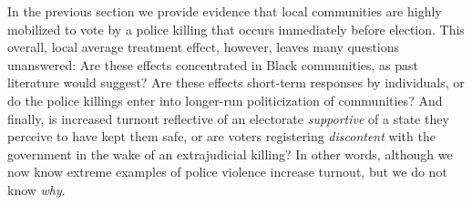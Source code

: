 \documentclass[12pt]{article}
\newcommand{\kscomment}[1]{\textbf{\textcolor{Thistle}{[[ #1 --- KS ]]}}}
\newcommand{\kmcomment}[1]{\textbf{\textcolor{JungleGreen}{[[ #1 --- KM ]]}}}
\begin{document}

In the previous section we provide evidence that local communities are highly mobilized to vote by a police killing that occurs immediately before election. This overall, local average treatment effect, however, leaves many questions unanswered: Are these effects concentrated in Black communities, as past literature would suggest? Are these effects short-term responses by individuals, or do the police killings enter into longer-run politicization of communities? And finally, is increased turnout reflective of an electorate \textit{supportive} of a state they perceive to have kept them safe, or are voters registering \textit{discontent} with the government in the wake of an extrajudicial killing? In other words, although we now know  extreme examples of police violence increase turnout, but we do not know \textit{why}.
\end{document}
